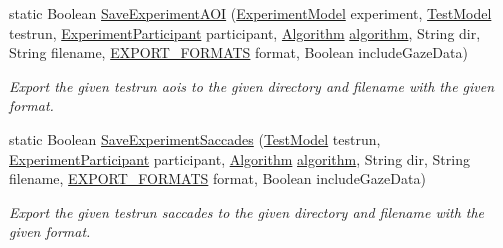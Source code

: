 \begin{DoxyCompactItemize}
static Boolean \hyperlink{class_web_analyzer_1_1_controller_1_1_export_controller_a0de1c7d796e601cd97240e507bcf15df}{Save\+Experiment\+A\+O\+I} (\hyperlink{class_web_analyzer_1_1_models_1_1_base_1_1_experiment_model}{Experiment\+Model} experiment, \hyperlink{class_web_analyzer_1_1_models_1_1_data_model_1_1_test_model}{Test\+Model} testrun, \hyperlink{class_web_analyzer_1_1_models_1_1_base_1_1_experiment_participant}{Experiment\+Participant} participant, \hyperlink{class_web_analyzer_1_1_models_1_1_algorithm_model_1_1_algorithm}{Algorithm} \hyperlink{_u_i_2_h_t_m_l_resources_2js_2src_2analyse_8js_a1222cf9678e9ad6a699b071d3308f976}{algorithm}, String dir, String filename, \hyperlink{class_web_analyzer_1_1_controller_1_1_export_controller_a8cea4a311ecaf495f305f9d7829a57aa}{E\+X\+P\+O\+R\+T\+\_\+\+F\+O\+R\+M\+A\+T\+S} format, Boolean include\+Gaze\+Data)
\begin{DoxyCompactList}\small\item\em Export the given testrun aois to the given directory and filename with the given format. \end{DoxyCompactList}\item 
static Boolean \hyperlink{class_web_analyzer_1_1_controller_1_1_export_controller_a50d952337020805f74247b44da7694ac}{Save\+Experiment\+Saccades} (\hyperlink{class_web_analyzer_1_1_models_1_1_data_model_1_1_test_model}{Test\+Model} testrun, \hyperlink{class_web_analyzer_1_1_models_1_1_base_1_1_experiment_participant}{Experiment\+Participant} participant, \hyperlink{class_web_analyzer_1_1_models_1_1_algorithm_model_1_1_algorithm}{Algorithm} \hyperlink{_u_i_2_h_t_m_l_resources_2js_2src_2analyse_8js_a1222cf9678e9ad6a699b071d3308f976}{algorithm}, String dir, String filename, \hyperlink{class_web_analyzer_1_1_controller_1_1_export_controller_a8cea4a311ecaf495f305f9d7829a57aa}{E\+X\+P\+O\+R\+T\+\_\+\+F\+O\+R\+M\+A\+T\+S} format, Boolean include\+Gaze\+Data)
\begin{DoxyCompactList}\small\item\em Export the given testrun saccades to the given directory and filename with the given format. \end{DoxyCompactList}\end{DoxyCompactItemize}
